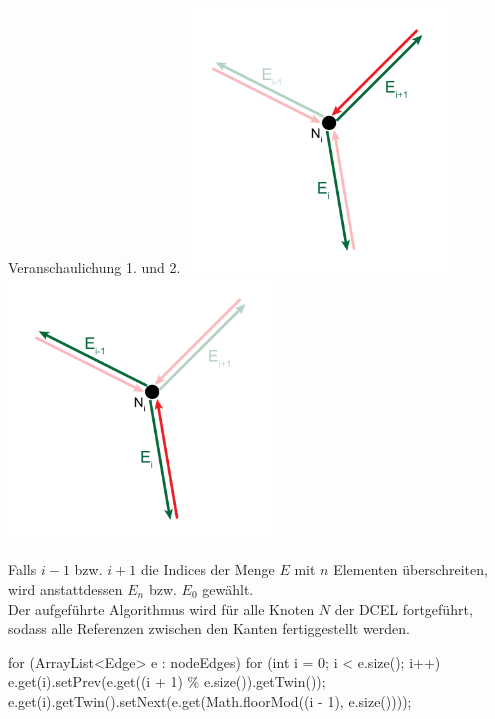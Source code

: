 \begin{Bild}{Veranschaulichung 1. und 2.}
	\includegraphics[width = 70mm]{Bilder/Beziehung1Kanten}
		\includegraphics[width = 70mm]{Bilder/Beziehung2Kanten}
\end{Bild}
Falls $i-1$ bzw. $i+1$ die Indices der Menge $E$ mit $n$ Elementen überschreiten, wird anstattdessen $E_n$ bzw. $E_0$ gewählt. \\
Der aufgeführte Algorithmus wird für alle Knoten $N$ der DCEL fortgeführt, sodass alle Referenzen zwischen den Kanten fertiggestellt werden. 
\begin{code}
	for (ArrayList<Edge> e : nodeEdges) {
		for (int i = 0; i < e.size(); i++) {
			e.get(i).setPrev(e.get((i + 1) \% e.size()).getTwin());
			e.get(i).getTwin().setNext(e.get(Math.floorMod((i - 1), e.size())));
		}
	}
\end{code}

